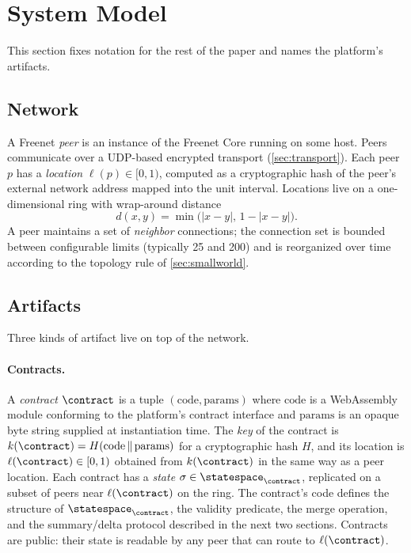 \section{System Model}
\label{sec:model}

This section fixes notation for the rest of the paper and names the platform's artifacts.

\subsection{Network}

A Freenet \emph{peer} is an instance of the Freenet Core running on some host. Peers communicate over a UDP-based encrypted transport (\cref{sec:transport}). Each peer $p$ has a \emph{location} $\ell(p) \in [0, 1)$, computed as a cryptographic hash of the peer's external network address mapped into the unit interval. Locations live on a one-dimensional ring with wrap-around distance
\[
  d(x, y) = \min\bigl(|x - y|,\, 1 - |x - y|\bigr).
\]
A peer maintains a set of \emph{neighbor} connections; the connection set is bounded between configurable limits (typically 25 and 200) and is reorganized over time according to the topology rule of \cref{sec:smallworld}.

\subsection{Artifacts}

Three kinds of artifact live on top of the network.

\paragraph{Contracts.} A \emph{contract} $\contract$ is a tuple $(\mathrm{code}, \mathrm{params})$ where $\mathrm{code}$ is a WebAssembly module conforming to the platform's contract interface and $\mathrm{params}$ is an opaque byte string supplied at instantiation time. The \emph{key} of the contract is $k(\contract) = H(\mathrm{code} \,\|\, \mathrm{params})$ for a cryptographic hash $H$, and its location is $\ell(\contract) \in [0, 1)$ obtained from $k(\contract)$ in the same way as a peer location. Each contract has a \emph{state} $\sigma \in \statespace_\contract$, replicated on a subset of peers near $\ell(\contract)$ on the ring. The contract's code defines the structure of $\statespace_\contract$, the validity predicate, the merge operation, and the summary/delta protocol described in the next two sections. Contracts are public: their state is readable by any peer that can route to $\ell(\contract)$.

